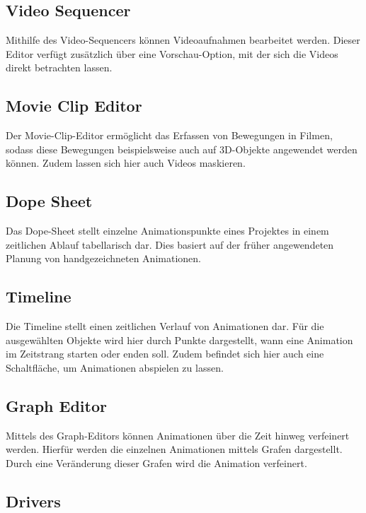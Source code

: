 \documentclass[
]{book}
\let\oldmarginnote\marginnote
\renewcommand{\marginnote}[1]{%
  \oldmarginnote{{\footnotesize\selectfont #1}}%
}
\begin{document}
\subsection{Video Sequencer}\label{video-sequencer}

Mithilfe des Video-Sequencers können Videoaufnahmen bearbeitet werden.
Dieser Editor verfügt zusätzlich über eine Vorschau-Option, mit der sich
die Videos direkt betrachten lassen.

\subsection{Movie Clip Editor}\label{movie-clip-editor}

Der Movie-Clip-Editor ermöglicht das Erfassen von Bewegungen in Filmen,
sodass diese Bewegungen beispielsweise auch auf 3D-Objekte angewendet
werden können. Zudem lassen sich hier auch Videos maskieren.

\subsection{Dope Sheet}\label{dope-sheet}

\marginnote{Editoren für Animationen}

Das Dope-Sheet stellt einzelne Animationspunkte eines Projektes in einem
zeitlichen Ablauf tabellarisch dar. Dies basiert auf der früher
angewendeten Planung von handgezeichneten Animationen.

\subsection{Timeline}\label{timeline}

Die Timeline stellt einen zeitlichen Verlauf von Animationen dar. Für
die ausgewählten Objekte wird hier durch Punkte dargestellt, wann eine
Animation im Zeitstrang starten oder enden soll. Zudem befindet sich
hier auch eine Schaltfläche, um Animationen abspielen zu lassen.

\subsection{Graph Editor}\label{graph-editor}

Mittels des Graph-Editors können Animationen über die Zeit hinweg
verfeinert werden. Hierfür werden die einzelnen Animationen mittels
Grafen dargestellt. Durch eine Veränderung dieser Grafen wird die
Animation verfeinert.

\subsection{Drivers}\label{drivers}
\end{document}
